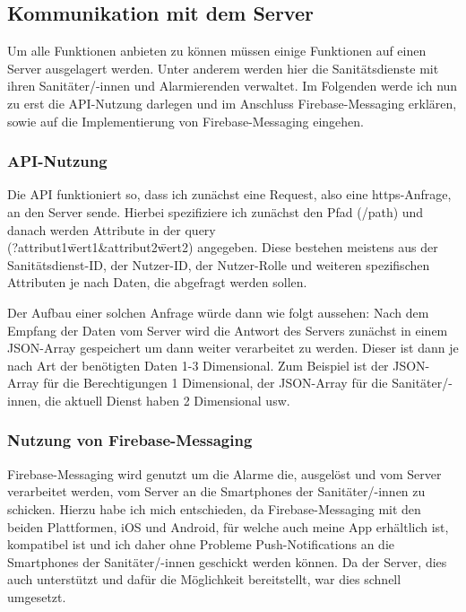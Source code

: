 \subsection{Kommunikation mit dem Server}
Um alle Funktionen anbieten zu können müssen einige Funktionen auf einen Server ausgelagert werden.
Unter anderem werden hier die Sanitätsdienste mit ihren Sanitäter/-innen und Alarmierenden verwaltet.
Im Folgenden werde ich nun zu erst die API-Nutzung darlegen und im Anschluss Firebase-Messaging erklären, sowie auf die 
Implementierung von Firebase-Messaging eingehen.
\subsubsection{API-Nutzung}
Die API funktioniert so, dass ich zunächst eine Request, also eine https-Anfrage, an den Server sende.
Hierbei spezifiziere ich zunächst den Pfad (/path) und danach werden Attribute in der query \\(?attribut1\=wert1\&attribut2\=wert2) angegeben. Diese bestehen meistens
aus der Sanitätsdienst-ID, der Nutzer-ID, der Nutzer-Rolle und weiteren spezifischen Attributen je nach Daten, die abgefragt werden sollen.

\noindent Der Aufbau einer solchen Anfrage würde dann wie folgt aussehen: 
Nach dem Empfang der Daten vom Server wird die Antwort des Servers zunächst in einem JSON-Array gespeichert um dann weiter verarbeitet zu werden.
Dieser ist dann je nach Art der benötigten Daten 1-3 Dimensional. Zum Beispiel ist der JSON-Array für die Berechtigungen 1 Dimensional, der JSON-Array für die 
Sanitäter/-innen, die aktuell Dienst haben 2 Dimensional usw.



\subsubsection{Nutzung von Firebase-Messaging}
Firebase-Messaging wird genutzt um die Alarme die, ausgelöst und vom Server verarbeitet werden, vom Server an die Smartphones der Sanitäter/-innen zu schicken.
Hierzu habe ich mich entschieden, da Firebase-Messaging mit den beiden Plattformen, iOS und Android, für welche auch meine App erhältlich ist, kompatibel ist und ich daher
ohne Probleme Push-Notifications an die Smartphones der Sanitäter/-innen geschickt werden können. Da der Server, dies auch unterstützt und dafür die Möglichkeit bereitstellt, war dies 
schnell umgesetzt.


